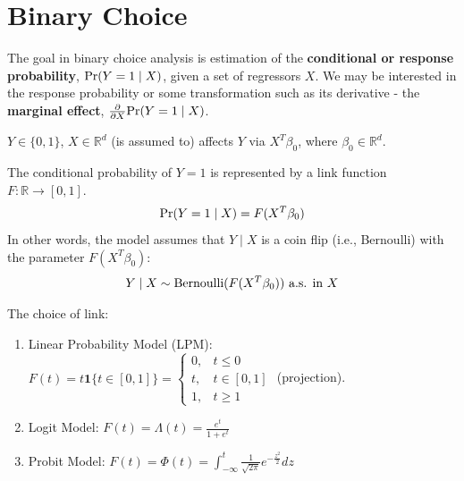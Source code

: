 \documentclass[11pt]{elegantbook}
\begin{document}
\section{Binary Choice}
The goal in binary choice analysis is estimation of the \textbf{conditional or response probability}, $\textnormal{Pr}(Y = 1 \mid X)$, given a set of regressors $X$. We may be interested in the response probability or some transformation such as its derivative - the \textbf{marginal effect}, $\frac{\partial }{\partial X}\textnormal{Pr}(Y = 1 \mid X)$.

$Y\in\{0,1\}$, $X\in \mathbb{R}^d$ (is assumed to) affects $Y$ via $X^T\beta_0$, where $\beta_0\in \mathbb{R}^d$.

The conditional probability of $Y=1$ is represented by a link function $F: \mathbb{R} \rightarrow [0,1]$.
\begin{equation}
    \begin{aligned}
        \textnormal{Pr}(Y=1\mid X)=F(X^T\beta_0)
    \end{aligned}
    \nonumber
\end{equation}
In other words, the model assumes that $Y \mid X$ is a coin flip (i.e., Bernoulli) with the parameter $F(X^T\beta_0)$:
\begin{equation}
    \begin{aligned}
        Y\mid X\sim \textnormal{Bernoulli}(F(X^T\beta_0)) \textnormal{ a.s. in }X
    \end{aligned}
    \nonumber
\end{equation}

\begin{example}
    The choice of link:
    \begin{enumerate}
        \item Linear Probability Model (LPM): $F(t)=t \mathbf{1}\{t\in[0,1]\}=\left\{\begin{matrix}
            0,&t\leq 0\\
            t,&t\in[0,1]\\
            1,&t\geq 1
        \end{matrix}\right.$ (projection).
        \item Logit Model: $F(t)=\Lambda(t)=\frac{e^t}{1+e^t}$
        \item Probit Model: $F(t)=\Phi(t)=\int_{-\infty}^t\frac{1}{\sqrt{2\pi}}e^{-\frac{z^2}{2}}dz$
    \end{enumerate}
\end{example}
\end{document}
